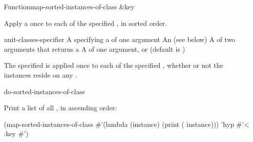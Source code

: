 \documentclass[10pt,twoside,english,pdftex]{article}
\begin{document}

\begin{functiondoc}{Function}{map-sorted-instances-of-class}%
{ \&key }
%
%

\fnsyntax

\fnpurpose Apply a  once to each 
of the specified , in sorted order.

\fnpackage {}

\fnmodule {}

\fnargs
\begin{args}{unit-classes-specifier}
\arg[function] A  specifying a
  of one argument
 An 
(see below)
\arg[predicate] A  of two arguments that returns a
\arg[key] A  of one argument, or \nil{} (default is \nil)
\end{args}

\fndsyntax
\W\supp\tabletop
\unitclassesspec
\subclassingspec

\fndescription  The specified  is applied once to each
 of the specified , whether
or not the instances reside on any .

\begin{alsos}{do-sorted-instances-of-class}
\end{alsos}

\fnexample
Print a list of all  , in ascending order:
%
\W\supp
\begin{example}
  (map-sorted-instances-of-class 
     #'(lambda (instance)
         (print ( instance)))
     'hyp #'< :key #')
\end{example} 

\end{functiondoc}

\end{document}
